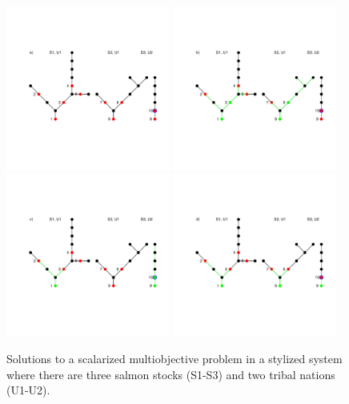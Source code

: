 \documentclass[12pt]{elsarticle}
\begin{document}
\begin{figure}
\includegraphics[width=0.48\textwidth]{figures/opt_s.pdf}
\includegraphics[width=0.48\textwidth]{figures/opt_h.pdf}
\includegraphics[width=0.48\textwidth]{figures/opt_e.pdf}
\includegraphics[width=0.48\textwidth]{figures/opt_d.pdf} 
\caption{Solutions to a scalarized multiobjective problem in a stylized system where there are three salmon stocks (S1-S3) and two tribal nations (U1-U2). \label{fig:opt}}
\end{figure}%
\end{document}
